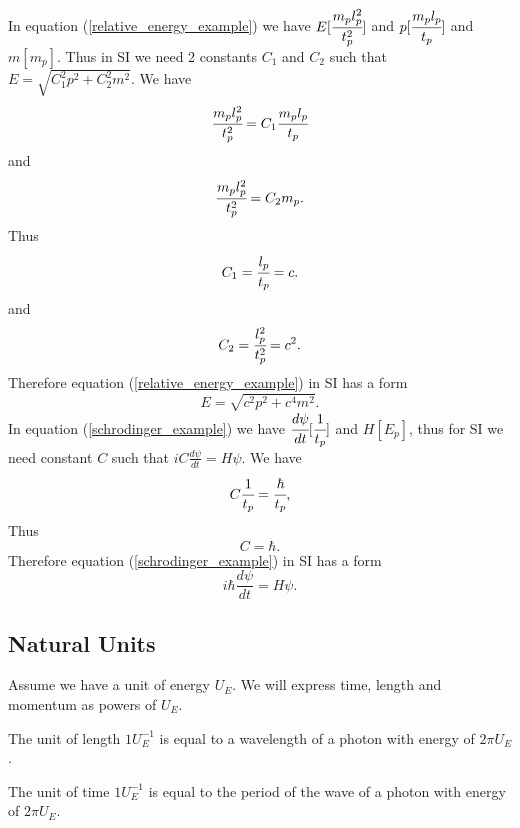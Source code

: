 \documentclass[main.tex]{subfiles}
\begin{document}
In equation (\ref{relative_energy_example}) we have $E [\cfrac{m_pl_p^2}{t_p^2}]$ and $p [\cfrac{m_pl_p}{t_p}]$ and $m [m_p]$. Thus in SI we need 2 constants $C_1$ and $C_2$ such that $E = \sqrt{C_1^2p^2 + C_2^2m^2}$. We have
\begin{equation}
    \cfrac{m_pl_p^2}{t_p^2} = C_1 \cfrac{m_pl_p}{t_p}
\end{equation}
and
\begin{equation}
    \cfrac{m_pl_p^2}{t_p^2} = C_2 m_p.
\end{equation}
Thus
\begin{equation}
    C_1 = \cfrac{l_p}{t_p} = c.
\end{equation}
and
\begin{equation}
    C_2 =  \cfrac{l_p^2}{t_p^2} = c^2.
\end{equation}
Therefore equation (\ref{relative_energy_example}) in SI has a form
\begin{equation}
    E = \sqrt{c^2p^2 + c^4m^2}.
\end{equation}
In equation (\ref{schrodinger_example}) we have $\cfrac{d\psi}{dt} [\cfrac{1}{t_p}]$ and
$H [E_p]$, thus for SI we need constant $C$ such that $i C\frac{d\psi}{dt} = H\psi$. We have
\begin{equation}
    C\cfrac{1}{t_p} = \cfrac{\hbar}{t_p},
\end{equation}
Thus
\begin{equation}
    C = \hbar.
\end{equation}
Therefore equation (\ref{schrodinger_example}) in SI has a form
\begin{equation}
    i \hbar \frac{d\psi}{dt} = H\psi.
\end{equation}
\subsection{Natural Units}
Assume we have a unit of energy $U_E$. We will express time, length and momentum as powers of $U_E$.

\begin{definition}
\label{length_definition}
The unit of length $1 U_E^{-1}$ is equal to a wavelength of a photon with energy of $2\pi U_E$.
\end{definition}

\begin{definition}
\label{time_definition}
The unit of time $1 U_E^{-1}$ is equal to the period of the wave of a photon with energy of $2\pi U_E$.
\end{definition}
\end{document}
